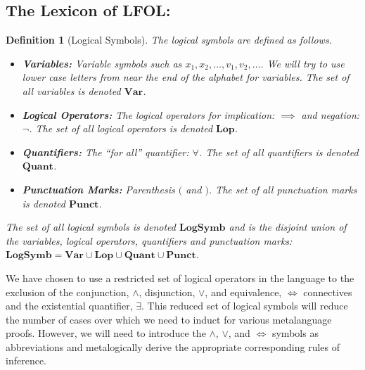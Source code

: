 \documentclass[12pt]{article}
\theoremstyle{break}
\newtheorem{definition}{Definition}[section]
\theoremstyle{break}
\theoremstyle{break}
\theoremstyle{break}
\theoremstyle{break}
\newtheorem{informal definition}[definition]{Informal Definition}
\newcommand{\qq}[1]{``#1''}
\begin{document}
\subsection{The Lexicon of LFOL:}

\begin{definition}[Logical Symbols]
The logical symbols are defined as follows.
\begin{itemize}
\item{\textbf{Variables:} Variable symbols such as $x_1, x_2, \ldots, v_1, v_2, \ldots$. We will try to use lower case letters from near the end of the alphabet for variables. The set of all variables is denoted $\textbf{Var}$.}
\item{\textbf{Logical Operators:} The logical operators for implication: $\implies$ and negation: $\lnot$. The set of all logical operators is denoted $\textbf{Lop}$.}
\item{\textbf{Quantifiers:} The \qq{for all} quantifier: $\forall$. The set of all quantifiers is denoted $\textbf{Quant}$.}
\item{\textbf{Punctuation Marks:} Parenthesis $($ and $)$. The set of all punctuation marks is denoted $\textbf{Punct}$.}
\end{itemize}

The set of all logical symbols is denoted $\textbf{LogSymb}$ and is the disjoint union of the variables, logical operators, quantifiers and punctuation marks: $\textbf{LogSymb} = \textbf{Var} \cup \textbf{Lop} \cup \textbf{Quant} \cup \textbf{Punct}$.
\end{definition}

We have chosen to use a restricted set of logical operators in the language to the exclusion of the conjunction, $\land$, disjunction, $\lor$, and equivalence, $\iff$ connectives and the existential quantifier, $\exists$.
This reduced set of logical symbols will reduce the number of cases over which we need to induct for various metalanguage proofs.
However, we will need to introduce the $\land$, $\lor$, and $\iff$ symbols as abbreviations and metalogically derive the appropriate corresponding rules of inference.
\end{document}
